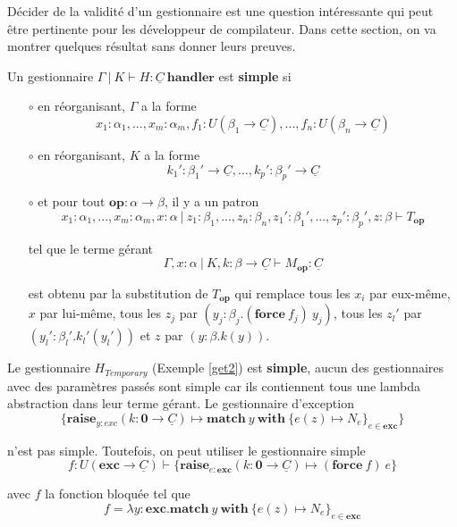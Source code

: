Décider de la validité d'un gestionnaire est une question intéressante qui peut être pertinente pour les développeur de compilateur. Dans cette section, on va montrer quelques résultat sans donner leurs preuves.
\newpage

\begin{definition}
	Un gestionnaire $\Gamma~|~K \vdash H:\underline{C}~\textbf{handler}$ est \textbf{simple} si
	
	\begin{enumerate}
		\item[$\circ$] en réorganisant, $\Gamma$ a la forme 
		\[x_1:\alpha_1,...,x_m:\alpha_m,f_1:U(\beta_1 \rightarrow \underline{C}),...,f_n:U(\beta_n \rightarrow \underline{C})\]
		
		\item[$\circ$] en réorganisant, $K$ a la forme
		\[k_1':\beta_1' \rightarrow \underline{C},...,k_p':\beta_p' \rightarrow \underline{C}\]
		
		\item[$\circ$] et pour tout $\textbf{op}: \alpha \rightarrow \beta$, il y a un patron
		\[x_1:\alpha_1,...,x_m:\alpha_m,x:\alpha~|~z_1:\beta_1,...,z_n:\beta_n,z_1':\beta_1',...,z_p':\beta_p',z:\beta \vdash T_\textbf{op}\]
		
		tel que le terme gérant 
		\[\Gamma,x:\alpha~|~K,k:\beta \rightarrow \underline{C} \vdash M_\textbf{op}:\underline{C}\]
		
		est obtenu par la substitution de $T_\textbf{op}$ qui remplace tous les $x_i$ par eux-même, $x$ par lui-même, tous les $z_j$ par $(y_j:\beta_j.(\textbf{force}~f_j)~y_j)$, tous les $z_l'$ par $(y_l':\beta_l'.k_l'(y_l'))$ et $z$ par $(y:\beta.k(y))$.
	\end{enumerate}
\end{definition}

Le gestionnaire $H_{Temporary}$ (Exemple \ref{get2}) est \textbf{simple}, aucun des gestionnaires avec des paramètres passés sont simple car ils contiennent tous une lambda abstraction dans leur terme gérant. Le gestionnaire d'exception 
\[\{\textbf{raise}_{y:exc}(k:\textbf{0} \rightarrow \underline{C}) \mapsto \textbf{match}~y~\textbf{with}~\{e(z) \mapsto N_e\}_{e \in \textbf{exc}}\}\] 

n'est pas simple. Toutefois, on peut utiliser le gestionnaire simple
\[f:U(\textbf{exc} \rightarrow \underline{C}) \vdash \{\textbf{raise}_{e : \textbf{exc}}(k:\textbf{0} \rightarrow \underline{C}) \mapsto (\textbf{force}~f)~e\}\]

avec  $f$ la fonction bloquée tel que 
	\[f = \lambda y:\textbf{exc}.\textbf{match}~y~\textbf{with}~\{e(z) \mapsto N_e\}_{e \in \textbf{exc}}\]
	
